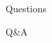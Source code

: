 \documentclass{beamer}
\begin{document}
\begin{frame}{Questions}
\begin{center}
\fontsize{60}{70}\selectfont Q\&A
\end{center}
\end{frame}
\end{document}

